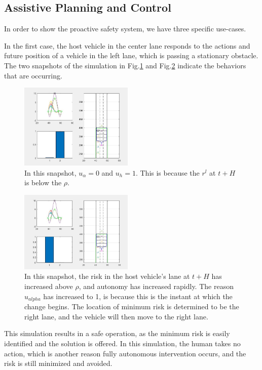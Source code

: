 \documentclass[letterpaper, 10 pt, conference]{ieeeconf}  %
\begin{document}
 
\subsection{Assistive Planning and Control}
In order to show the proactive safety system, we have three specific use-cases.

In the first case, the host vehicle in the center lane responds to the actions and future position of a vehicle in the left lane, which is passing a stationary obstacle. The two snapshots of the simulation in Fig.\ref{fig:cs1} and Fig.\ref{fig:cs1b} indicate the behaviors that are occurring.

\begin{figure}[ht]
    \includegraphics[width=0.48\textwidth]{cs1.JPG}
    \caption{In this snapshot, $u_{\alpha} = 0$ and $u_{h} = 1$. This is because the $r^l$ at $t+H$ is below the $\rho$.}
    \label{fig:cs1}
\end{figure}

\begin{figure}[ht]
    \includegraphics[width=0.48\textwidth]{cs1b.JPG}
    \caption{In this snapshot, the risk in the host vehicle's lane at $t+H$ has increased above $\rho$, and autonomy has increased rapidly. The reason $u_{alpha}$ has increased to 1, is because this is the instant at which the change begins. The location of minimum risk is determined to be the right lane, and the vehicle will then move to the right lane.}
    \label{fig:cs1b}
\end{figure}

This simulation results in a safe operation, as the minimum risk is easily identified and the solution is offered. In this simulation, the human takes no action, which is another reason fully autonomous intervention occurs, and the risk is still minimized and avoided.
\end{document}

